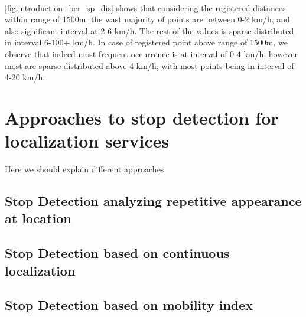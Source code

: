 \\
\autoref{fig:introduction_ber_sp_dis} shows that considering the registered distances within range of 1500m, the wast majority of points are between 0-2 km/h, and also significant interval at 2-6 km/h. The rest of the values is sparse distributed in interval 6-100+ km/h. In case of registered point above range of 1500m, we observe that indeed most frequent occurrence is at interval of 0-4 km/h, however most are sparse distributed above 4 km/h, with most points being in interval of 4-20 km/h. 
\FloatBarrier

\section{Approaches to stop detection for localization services}
\label{cha:introduction_appr_stopdet}

Here we should explain different approaches

\subsection{Stop Detection analyzing repetitive appearance at location}

\subsection{Stop Detection based on continuous localization}

\subsection{Stop Detection based on mobility index}
\label{cha:introduction_mob_index_sect}

